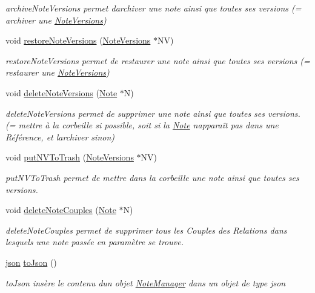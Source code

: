 \begin{DoxyCompactItemize}
\begin{DoxyCompactList}\small\item\em archive\+Note\+Versions permet d\textquotesingle{}archiver une note ainsi que toutes ses versions (= archiver une \hyperlink{classNoteVersions}{Note\+Versions}) \end{DoxyCompactList}\item 
void \hyperlink{classNoteManager_a12f662fc21e236883b8b047df9017ebc}{restore\+Note\+Versions} (\hyperlink{classNoteVersions}{Note\+Versions} $\ast$NV)
\begin{DoxyCompactList}\small\item\em restore\+Note\+Versions permet de restaurer une note ainsi que toutes ses versions (= restaurer une \hyperlink{classNoteVersions}{Note\+Versions}) \end{DoxyCompactList}\item 
void \hyperlink{classNoteManager_af6d2605fc8319600c4a283ba9879dbd6}{delete\+Note\+Versions} (\hyperlink{classNote}{Note} $\ast$N)
\begin{DoxyCompactList}\small\item\em delete\+Note\+Versions permet de supprimer une note ainsi que toutes ses versions. (= mettre à la corbeille si possible, soit si la \hyperlink{classNote}{Note} n\textquotesingle{}apparaît pas dans une Référence, et l\textquotesingle{}archiver sinon) \end{DoxyCompactList}\item 
void \hyperlink{classNoteManager_a2104f9d473176be2f0f25b853ffc8217}{put\+N\+V\+To\+Trash} (\hyperlink{classNoteVersions}{Note\+Versions} $\ast$NV)
\begin{DoxyCompactList}\small\item\em put\+N\+V\+To\+Trash permet de mettre dans la corbeille une note ainsi que toutes ses versions. \end{DoxyCompactList}\item 
void \hyperlink{classNoteManager_a3e871a622b36acb98257cd60002c558c}{delete\+Note\+Couples} (\hyperlink{classNote}{Note} $\ast$N)
\begin{DoxyCompactList}\small\item\em delete\+Note\+Couples permet de supprimer tous les Couples des Relations dans lesquels une note passée en paramètre se trouve. \end{DoxyCompactList}\item 
\hyperlink{classnlohmann_1_1basic__json}{json} \hyperlink{classNoteManager_ae545854ea1add5db3b819a05842b0bf5}{to\+Json} ()
\begin{DoxyCompactList}\small\item\em to\+Json insère le contenu d\textquotesingle{}un objet \hyperlink{classNoteManager}{Note\+Manager} dans un objet de type json \end{DoxyCompactList}\item 

\end{DoxyCompactItemize}
